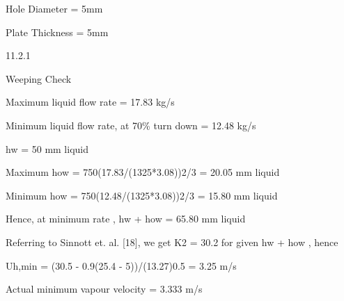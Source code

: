 \documentclass[a4paper,portrait,12pt]{article}
\begin{document}
\begin{flushleft}
Hole Diameter = 5mm
\end{flushleft}


\begin{flushleft}
Plate Thickness = 5mm
\end{flushleft}





11.2.1





\begin{flushleft}
Weeping Check
\end{flushleft}





\begin{flushleft}
Maximum liquid flow rate = 17.83 kg/s
\end{flushleft}


\begin{flushleft}
Minimum liquid flow rate, at 70\% turn down = 12.48 kg/s
\end{flushleft}


\begin{flushleft}
hw = 50 mm liquid
\end{flushleft}


\begin{flushleft}
Maximum how = 750(17.83/(1325*3.08))2/3 = 20.05 mm liquid
\end{flushleft}


\begin{flushleft}
Minimum how = 750(12.48/(1325*3.08))2/3 = 15.80 mm liquid
\end{flushleft}


\begin{flushleft}
Hence, at minimum rate , hw + how = 65.80 mm liquid
\end{flushleft}


\begin{flushleft}
Referring to Sinnott et. al. [18], we get K2 = 30.2 for given hw + how , hence
\end{flushleft}


\begin{flushleft}
Uh,min = (30.5 - 0.9(25.4 - 5))/(13.27)0.5 = 3.25 m/s
\end{flushleft}


\begin{flushleft}
Actual minimum vapour velocity = 3.333 m/s
\end{flushleft}
\end{document}

